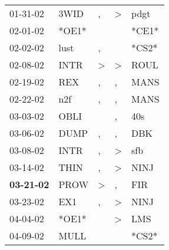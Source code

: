 \begin{supertabular}{p{0.07\textwidth}p{0.06\textwidth}p{0.02\textwidth}p{0.02\textwidth}p{0.06\textwidth}}
          01-31-02\textsuperscript{} &           3WID\textsuperscript{} &                , &     \textgreater &           pdgt\textsuperscript{} \\
          02-01-02\textsuperscript{} &                            *OE1* &                  &                  &                            *CE1* \\
          02-02-02\textsuperscript{} &           lust\textsuperscript{} &                , &                  &                            *CS2* \\
          02-08-02\textsuperscript{} &           INTR\textsuperscript{} &     \textgreater &     \textgreater &           ROUL\textsuperscript{} \\
          02-19-02\textsuperscript{} &            REX\textsuperscript{} &                , &                , &           MANS\textsuperscript{} \\
          02-22-02\textsuperscript{} &            n2f\textsuperscript{} &                , &                , &           MANS\textsuperscript{} \\
          03-03-02\textsuperscript{} &           OBLI\textsuperscript{} &                  &                , &            40s\textsuperscript{} \\
          03-06-02\textsuperscript{} &           DUMP\textsuperscript{} &                , &                , &            DBK\textsuperscript{} \\
          03-08-02\textsuperscript{} &           INTR\textsuperscript{} &                , &     \textgreater &            sfb\textsuperscript{} \\
          03-14-02\textsuperscript{} &           THIN\textsuperscript{} &                , &     \textgreater &           NINJ\textsuperscript{} \\
 \textbf{03-21-02\textsuperscript{}} &           PROW\textsuperscript{} &     \textgreater &                , &            FIR\textsuperscript{} \\
          03-23-02\textsuperscript{} &            EX1\textsuperscript{} &                , &     \textgreater &           NINJ\textsuperscript{} \\
          04-04-02\textsuperscript{} &                            *OE1* &                  &     \textgreater &            LMS\textsuperscript{} \\
          04-09-02\textsuperscript{} &           MULL\textsuperscript{} &                  &                  &                            *CS2* \\

\end{supertabular}
